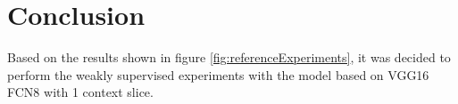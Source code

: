 
\section{Conclusion}
Based on the results shown in figure \ref{fig:referenceExperiments}, it was decided to perform the weakly supervised experiments with the model based on VGG16 FCN8 with 1 context slice.
